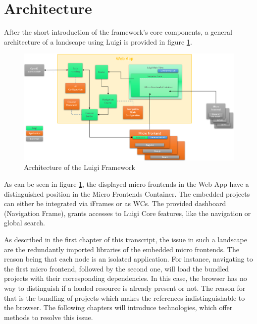 \section{Architecture}

After the short introduction of the framework's core components, a general architecture of a landscape using Luigi is provided in figure \ref{fig:luigi_architecture_fig}.

\begin{figure}[!h]
	\centering
	\includegraphics[width=1.\textwidth]{Figures/Luigi_Architektur.png}
	\caption{Architecture of the Luigi Framework \cite{luigi_architecture}}
	\label{fig:luigi_architecture_fig}
\end{figure}

As can be seen in figure \ref{fig:luigi_architecture_fig}, the displayed micro frontends in the Web App have a distinguished position in the Micro Frontends Container. The embedded projects can either be integrated via iFrames or as WCs.
The provided dashboard (Navigation Frame), grants accesses to Luigi Core features, like the navigation or global search.

As described in the first chapter of this transcript, the issue in such a landscape are the redundantly imported libraries of the embedded micro frontends. The reason being that each node is an isolated application.
For instance, navigating to the first micro frontend, followed by the second one, will load the bundled projects with their corresponding dependencies. In this case, the browser has no way to distinguish if a loaded resource is already present or not. The reason for that is the bundling of projects which makes the references indistinguishable to the browser.
The following chapters will introduce technologies, which offer methods to resolve this issue. 
 
